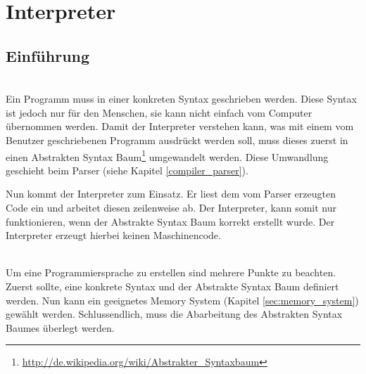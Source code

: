 

\chapter{Interpreter}

\section{Einführung}




\\
Ein Programm muss in einer konkreten Syntax geschrieben werden. Diese Syntax ist jedoch nur für den Menschen, sie kann nicht einfach vom Computer übernommen werden. Damit der Interpreter verstehen kann, was mit einem vom Benutzer geschriebenen Programm ausdrückt werden soll, muss dieses zuerst in einen Abstrakten Syntax Baum\footnote{\url{http://de.wikipedia.org/wiki/Abstrakter_Syntaxbaum}} umgewandelt werden. Diese Umwandlung geschieht beim Parser (siehe Kapitel \ref{compiler_parser}).

Nun kommt der Interpreter zum Einsatz. Er liest dem vom Parser erzeugten Code ein und arbeitet diesen zeilenweise ab. Der Interpreter, kann somit nur funktionieren, wenn der Abstrakte Syntax Baum korrekt erstellt wurde. Der Interpreter erzeugt hierbei keinen Maschinencode.

\\
Um eine Programmiersprache zu erstellen sind mehrere Punkte zu beachten. Zuerst sollte, eine konkrete Syntax und der Abstrakte Syntax Baum definiert werden. Nun kann ein geeignetes Memory System (Kapitel \ref{sec:memory_system}) gewählt werden. Schlussendlich, muss die Abarbeitung des Abstrakten Syntax Baumes überlegt werden.


